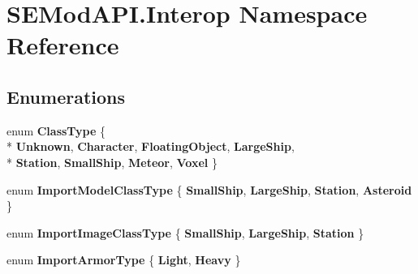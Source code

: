 \hypertarget{namespace_s_e_mod_a_p_i_1_1_interop}{}\section{S\+E\+Mod\+A\+P\+I.\+Interop Namespace Reference}
\label{namespace_s_e_mod_a_p_i_1_1_interop}
\subsection*{Enumerations}
\begin{DoxyCompactItemize}
\item 
\hypertarget{namespace_s_e_mod_a_p_i_1_1_interop_a48f79a8b51ab5f47363495a45d773f9d}{}enum {\bfseries Class\+Type} \{ \\*
{\bfseries Unknown}, 
{\bfseries Character}, 
{\bfseries Floating\+Object}, 
{\bfseries Large\+Ship}, 
\\*
{\bfseries Station}, 
{\bfseries Small\+Ship}, 
{\bfseries Meteor}, 
{\bfseries Voxel}
 \}\label{namespace_s_e_mod_a_p_i_1_1_interop_a48f79a8b51ab5f47363495a45d773f9d}

\item 
\hypertarget{namespace_s_e_mod_a_p_i_1_1_interop_abe5dfe1ad9d9b254cf8335a9e679d09b}{}enum {\bfseries Import\+Model\+Class\+Type} \{ {\bfseries Small\+Ship}, 
{\bfseries Large\+Ship}, 
{\bfseries Station}, 
{\bfseries Asteroid}
 \}\label{namespace_s_e_mod_a_p_i_1_1_interop_abe5dfe1ad9d9b254cf8335a9e679d09b}

\item 
\hypertarget{namespace_s_e_mod_a_p_i_1_1_interop_a74793e65e2a1ff758e26e454f26836d8}{}enum {\bfseries Import\+Image\+Class\+Type} \{ {\bfseries Small\+Ship}, 
{\bfseries Large\+Ship}, 
{\bfseries Station}
 \}\label{namespace_s_e_mod_a_p_i_1_1_interop_a74793e65e2a1ff758e26e454f26836d8}

\item 
\hypertarget{namespace_s_e_mod_a_p_i_1_1_interop_ae10a6da21cf62afae623985d16f7a7e6}{}enum {\bfseries Import\+Armor\+Type} \{ {\bfseries Light}, 
{\bfseries Heavy}
 \}\label{namespace_s_e_mod_a_p_i_1_1_interop_ae10a6da21cf62afae623985d16f7a7e6}


\end{DoxyCompactItemize}

